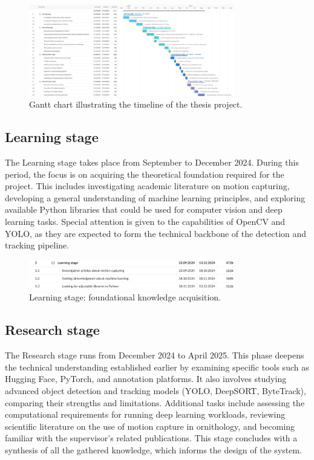 \begin{figure}[H]
	\centering
	\includegraphics[width=0.8\textwidth]{archivos/figuras/gantt-chart.jpg}
	\caption{Gantt chart illustrating the timeline of the thesis project.}
	\label{fig:gantt-chart}
\end{figure}

\subsection{Learning stage}

The Learning stage takes place from September to December 2024. During this period, the focus is on acquiring the theoretical foundation required for the project. This includes investigating academic literature on motion capturing, developing a general understanding of machine learning principles, and exploring available Python libraries that could be used for computer vision and deep learning tasks. Special attention is given to the capabilities of OpenCV and YOLO, as they are expected to form the technical backbone of the detection and tracking pipeline.

\begin{figure}[H]
	\centering
	\includegraphics[width=0.8\textwidth]{archivos/figuras/learning-stage.jpg}
	\caption{Learning stage: foundational knowledge acquisition.}
	\label{fig:learning-stage}
\end{figure}
	
\subsection{Research stage}

The Research stage runs from December 2024 to April 2025. This phase deepens the technical understanding established earlier by examining specific tools such as Hugging Face, PyTorch, and annotation platforms. It also involves studying advanced object detection and tracking models (YOLO, DeepSORT, ByteTrack), comparing their strengths and limitations. Additional tasks include assessing the computational requirements for running deep learning workloads, reviewing scientific literature on the use of motion capture in ornithology, and becoming familiar with the supervisor’s related publications. This stage concludes with a synthesis of all the gathered knowledge, which informs the design of the system.

